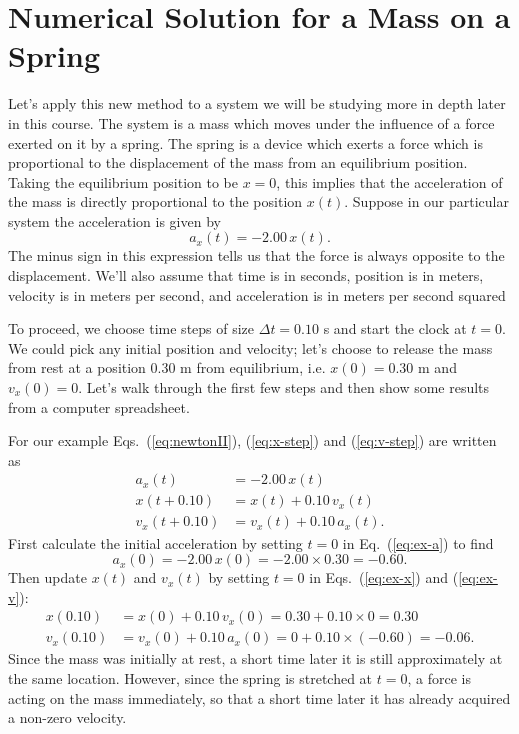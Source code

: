 \section{Numerical Solution for a Mass on a Spring}

Let's apply this new method to a system we will be studying more in
depth later in this course.  The system is a mass which moves under
the influence of a force exerted on it by a spring.  The spring is a
device which exerts a force which is proportional to the displacement
of the mass from an equilibrium position.  Taking the equilibrium
position to be $x = 0$, this implies that the acceleration of the mass
is directly proportional to the position $x(t)$.  Suppose in our
particular system the acceleration is given by 
\begin{equation}
a_x(t) = -2.00\, x(t).
\end{equation}
The minus sign in this expression tells us that the force is
always opposite to the displacement.  We'll also assume that time is
in seconds, position is in meters, velocity is in meters per second,
and acceleration is in meters per second squared
   
To proceed, we choose time steps of size $\Delta t = 0.10$ s and start
the clock at $t = 0$.  We could pick any initial position and
velocity; let's choose to release the mass from rest at a position
0.30 m from equilibrium, i.e. $x(0) = 0.30$ m and $v_x(0) = 0$.  Let's
walk through the first few steps and then show some results from a
computer spreadsheet.
   
For our example Eqs.~(\ref{eq:newtonII}), (\ref{eq:x-step}) and
(\ref{eq:v-step}) are written as
\begin{align}
a_x(t) &= -2.00\, x(t) 
\label{eq:ex-a}\\
x(t+0.10) &= x(t) + 0.10\, v_x(t) 
\label{eq:ex-x}\\
v_x(t+0.10) &= v_x(t) + 0.10\, a_x(t).
\label{eq:ex-v}
\end{align}
First calculate the initial acceleration by setting $t = 0$ in
Eq.~(\ref{eq:ex-a}) to find
\begin{equation}
a_x(0) = -2.00\, x(0)  = -2.00 \times 0.30 = -0.60.
\end{equation}
Then update $x(t)$ and $v_x(t)$ by setting $t = 0$ in Eqs.~(\ref{eq:ex-x}) and 
(\ref{eq:ex-v}):
\begin{align}
x(0.10) &= x(0) + 0.10\, v_x(0) = 0.30 + 0.10\times 0 = 0.30 \\
v_x(0.10) &= v_x(0) + 0.10\, a_x(0) = 0 + 0.10\times(-0.60) = -0.06.
\end{align}
Since the mass was initially at rest, a short time later it is still
approximately at the same location.  However, since the spring is
stretched at $t = 0$, a force is acting on the mass immediately, so
that a short time later it has already acquired a non-zero velocity.
   
